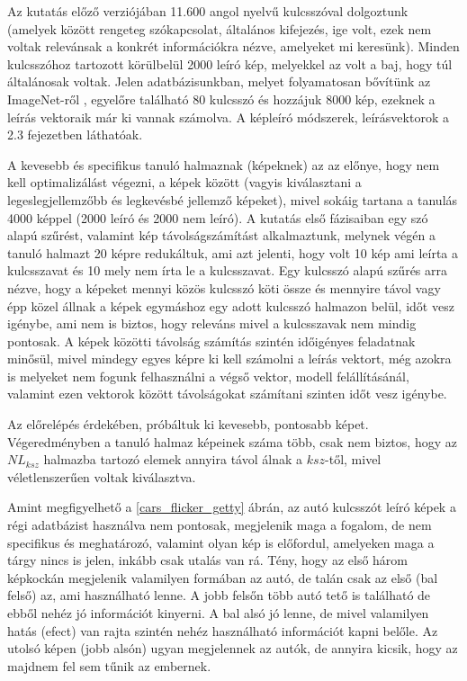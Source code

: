 \documentclass[12pt, a4paper, oneside]{book}
\theoremstyle{tetel}
\begin{document}
	Az kutatás előző verziójában 11.600 angol nyelvű kulcsszóval dolgoztunk (amelyek között rengeteg szókapcsolat, általános kifejezés, ige volt, ezek nem voltak relevánsak a konkrét információkra nézve, amelyeket mi keresünk). Minden kulcsszóhoz tartozott körülbelül 2000 leíró kép, melyekkel az volt a baj, hogy túl általánosak voltak. Jelen adatbázisunkban, melyet folyamatosan bővítünk az ImageNet-ről \cite{3}, egyelőre található  80 kulcsszó és hozzájuk 8000 kép, ezeknek a leírás vektoraik már ki vannak számolva.  A képleíró módszerek, leírásvektorok a 2.3 fejezetben láthatóak.

	A kevesebb és specifikus tanuló halmaznak (képeknek) az az előnye, hogy nem kell optimalizálást végezni, a képek között (vagyis kiválasztani a legeslegjellemzőbb és legkevésbé jellemző képeket), mivel sokáig tartana a tanulás 4000 képpel (2000 leíró és 2000 nem leíró). A kutatás első fázisaiban egy szó alapú szűrést, valamint kép távolságszámítást alkalmaztunk, melynek végén a tanuló halmazt 20 képre redukáltuk, ami azt jelenti, hogy volt 10 kép ami leírta a kulcsszavat és 10 mely nem írta le a kulcsszavat. Egy kulcsszó alapú szűrés arra nézve, hogy a képeket mennyi közös kulcsszó köti össze és mennyire távol vagy épp közel állnak a képek egymáshoz egy adott kulcsszó halmazon belül, időt vesz igénybe, ami nem is biztos, hogy releváns mivel a kulcsszavak nem mindig pontosak.  A képek közötti távolság számítás szintén időigényes feladatnak minősül, mivel mindegy egyes képre ki kell számolni a leírás vektort, még azokra is melyeket nem fogunk felhasználni a végső vektor, modell felállításánál, valamint ezen vektorok között távolságokat számítani szinten időt vesz igénybe. 

	Az előrelépés érdekében, próbáltuk ki kevesebb, pontosabb képet. Végeredményben a tanuló halmaz képeinek száma több, csak nem biztos, hogy az $NL_{ksz}$ halmazba tartozó elemek annyira távol álnak a $ksz$-től, mivel véletlenszerűen voltak kiválasztva.

	Amint megfigyelhető a \ref{cars_flicker_getty} ábrán, az autó kulcsszót leíró képek a régi adatbázist használva nem pontosak, megjelenik maga a fogalom, de nem specifikus és meghatározó, valamint olyan kép is előfordul, amelyeken maga a tárgy nincs is jelen, inkább csak utalás van rá. Tény, hogy az első három képkockán megjelenik valamilyen formában az autó, de talán csak az első (bal felső) az, ami használható lenne. A jobb felsőn több autó tető is található de ebből nehéz jó információt kinyerni. A bal alsó jó lenne, de mivel valamilyen hatás (efect) van rajta szintén nehéz használható információt kapni belőle. Az utolsó képen (jobb alsón) ugyan megjelennek az autók, de annyira kicsik, hogy az majdnem fel sem tűnik az embernek.  
\end{document}
